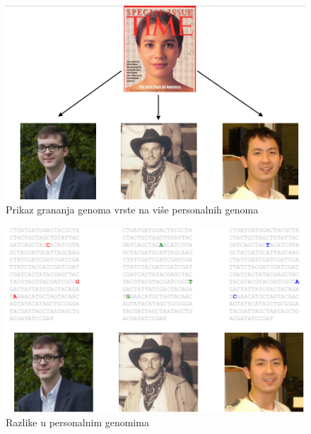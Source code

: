 \begin{figure}[h!]
\centering
\includegraphics[scale=0.5]{poglavlja/9/slike/OdGenomaVrsteDoPersonalnih.png}
\caption{Prikaz grananja genoma vrste na više personalnih genoma}
\label{slika:X}
\end{figure}



\begin{figure}[h!]
\centering
\includegraphics[scale=0.5]{poglavlja/9/slike/OdGenomaVrsteDoPersonalnih2.png}
\caption{Razlike u personalnim genomima}
\label{slika:X}
\end{figure}


